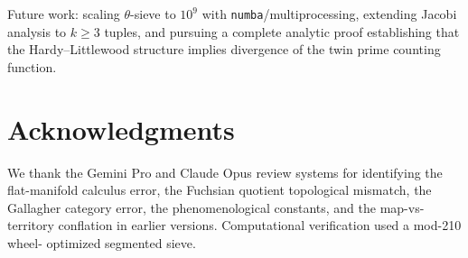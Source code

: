 \documentclass[12pt]{article}
\begin{document}
Future work: scaling $\theta$-sieve to $10^9$ with \texttt{numba}/multiprocessing,
extending Jacobi analysis to $k \geq 3$ tuples, and pursuing a complete analytic
proof establishing that the Hardy--Littlewood structure implies divergence of the
twin prime counting function.

\section*{Acknowledgments}

We thank the Gemini Pro and Claude Opus review systems for identifying the
flat-manifold calculus error, the Fuchsian quotient topological mismatch, the
Gallagher category error, the phenomenological constants, and the map-vs-territory
conflation in earlier versions. Computational verification used a mod-210 wheel-
optimized segmented sieve.
\end{document}
